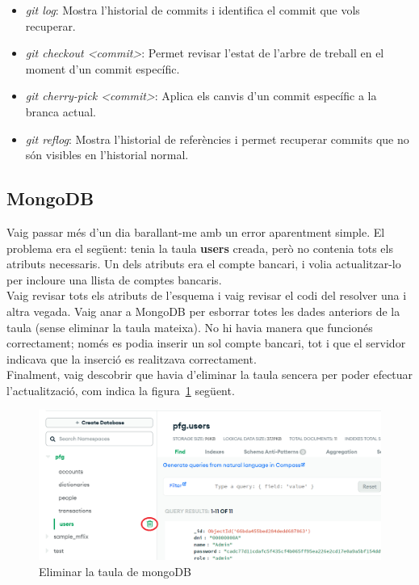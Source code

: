 \documentclass[a4paper,12pt,twoside]{ThesisStyle}
\begin{document}
\begin{itemize}
  \item \textit{git log}: Mostra l'historial de commits i identifica el commit que vols recuperar.
  \item \textit{git checkout <commit>}: Permet revisar l'estat de l'arbre de treball en el moment d'un commit específic.
  \item \textit{git cherry-pick <commit>}: Aplica els canvis d'un commit específic a la branca actual.
  \item \textit{git reflog}: Mostra l'historial de referències i permet recuperar commits que no són visibles en l'historial normal.
\end{itemize}


\subsection{MongoDB}
\label{subsec: MongoDB}

Vaig passar més d'un dia barallant-me amb un error aparentment simple. El problema era el següent: tenia la taula \textbf{users} creada, però no contenia tots els atributs necessaris. Un dels atributs era el compte bancari, i volia actualitzar-lo per incloure una llista de comptes bancaris.\\

Vaig revisar tots els atributs de l'esquema i vaig revisar el codi del resolver una i altra vegada. Vaig anar a MongoDB per esborrar totes les dades anteriors de la taula (sense eliminar la taula mateixa). No hi havia manera que funcionés correctament; només es podia inserir un sol compte bancari, tot i que el servidor indicava que la inserció es realitzava correctament.\\

Finalment, vaig descobrir que havia d'eliminar la taula sencera per poder efectuar l'actualització, com indica la figura~\ref{fig: Eliminar la taula de mongoDB} següent.


\begin{figure}[h]
    \centering
    \includegraphics[width=1\textwidth]{imatges/eliminarMongo.png}
    \caption{Eliminar la taula de mongoDB}
    \label{fig: Eliminar la taula de mongoDB}
\end{figure}
\end{document}
